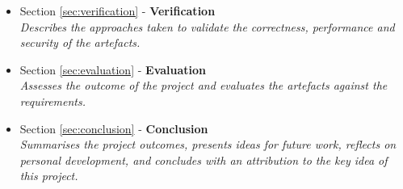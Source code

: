 \begin{itemize}
\clearpage %
	\item Section \ref{sec:verification} - \textbf{Verification} \\ \textit{Describes the approaches taken to validate the correctness, performance and security of the artefacts.}
	\item Section \ref{sec:evaluation} - \textbf{Evaluation} \\ \textit{Assesses the outcome of the project and evaluates the artefacts against the requirements.}
	\item Section \ref{sec:conclusion} - \textbf{Conclusion} \\ \textit{Summarises the project outcomes, presents ideas for future work, reflects on personal development, and concludes with an attribution to the key idea of this project.}
\end{itemize}
